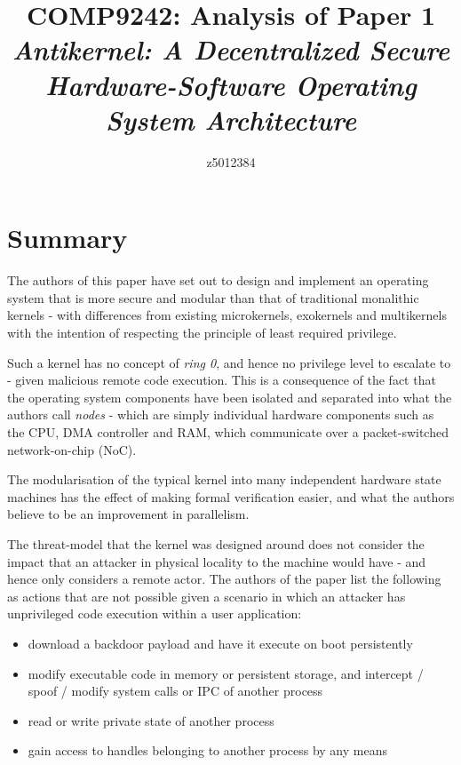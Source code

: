 \documentclass{article}
\begin{document}
\title{COMP9242: Analysis of Paper 1 \\ \vspace{0.75cm} \large \textit{Antikernel: A Decentralized Secure Hardware-Software Operating System Architecture}}

\author{z5012384}

\maketitle

\section*{Summary}
The authors of this paper have set out to design and implement an operating system that is more secure and modular than that of traditional monalithic kernels - with differences from existing microkernels, exokernels and multikernels with the intention of respecting the principle of least required privilege.

Such a kernel has no concept of \textit{ring 0}, and hence no privilege level to escalate to - given malicious remote code execution. This is a consequence of the fact that the operating system components have been isolated and separated into what the authors call \textit{nodes} - which are simply individual hardware components such as the CPU, DMA controller and RAM, which communicate over a packet-switched network-on-chip (NoC).

The modularisation of the typical kernel into many independent hardware state machines has the effect of making formal verification easier, and what the authors believe to be an improvement in parallelism.

The threat-model that the kernel was designed around does not consider the impact that an attacker in physical locality to the machine would have - and hence only considers a remote actor. The authors of the paper list the following as actions that are not possible given a scenario in which an attacker has unprivileged code execution within a user application:
\begin{itemize}
\item download a backdoor payload and have it execute on boot persistently
\item modify executable code in memory or persistent storage, and intercept / spoof / modify system calls or IPC of another process
\item read or write private state of another process
\item gain access to handles belonging to another process by any means
\end{itemize}
\end{document}
